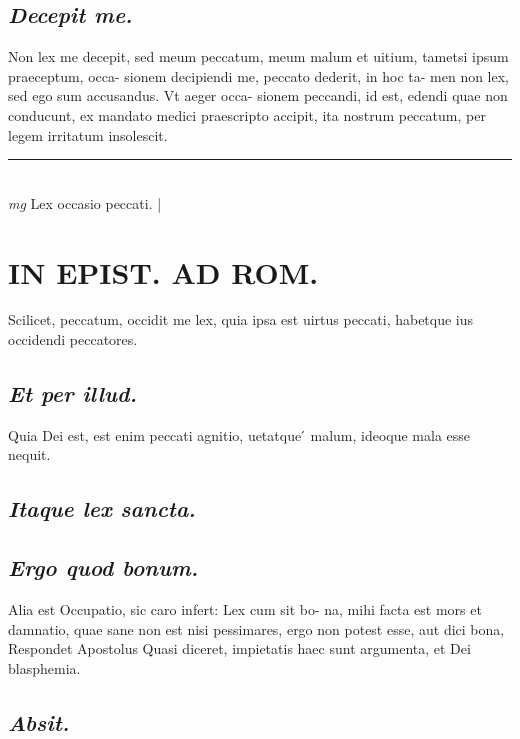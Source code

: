 \documentclass{article}
\begin{document}
\begin{pages}
\subsection*{\textit{Decepit me. }}\pstart Non lex me decepit, sed meum peccatum, meum malum et uitium, tametsi ipsum praeceptum, occa- sionem decipiendi me, peccato dederit, in hoc ta- men non lex, sed ego sum accusandus. Vt aeger occa- sionem peccandi, id est, edendi quae non conducunt, ex mandato medici praescripto accipit, ita nostrum peccatum, per legem irritatum insolescit.   \pend
\vspace{0.5cm}\noindent
\vspace{0.2cm}\rule{1cm}{0.2pt}\\ 
\hspace{0.2cm}\textit{mg}
\footnotesize Lex occasio peccati.  
\normalsize| 
\section*{IN EPIST. AD ROM.  }
\marginpar{[ p.70 ]}\pstart Scilicet, peccatum, occidit me lex, quia ipsa est uirtus peccati, habetque ius occidendi peccatores.   \pend
{}
{}
\subsection*{\textit{Et per illud. }}\pstart Quia Dei est, est enim peccati agnitio, uetatque ́ malum, ideoque mala esse nequit.   \pend
{}
{}
\subsection*{\textit{Itaque lex sancta. }}
{}
\subsection*{\textit{Ergo quod bonum. }}\pstart Alia est Occupatio, sic caro infert: Lex cum sit bo- na, mihi facta est mors et damnatio, quae sane non est nisi pessimares, ergo non potest esse, aut dici bona, Respondet Apostolus  \pend\pstart Quasi diceret, impietatis haec sunt argumenta, et Dei blasphemia.   \pend
{}
{}
\subsection*{\textit{Absit. }}
{}

\end{pages}
\end{document}
